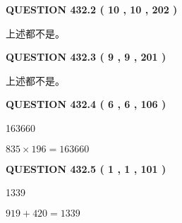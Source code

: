 \documentclass{ctexart}
\begin{document}
 
  
\vspace{0.2in}
  
{\textbf{\Large{QUESTION
432.2 
 ( 10 , 10 , 202 )
}}}
  
  
 
 
\noindent{}
 
 
 上述都不是。
 
 
 
 
  
\vspace{0.2in}
  
{\textbf{\Large{QUESTION
432.3 
 ( 9 , 9 , 201 )
}}}
  
  
 
 
\noindent{}
 
 
 上述都不是。
 
 
 
 
  
\vspace{0.2in}
  
{\textbf{\Large{QUESTION
432.4 
 ( 6 , 6 , 106 )
}}}
  
  
 
 
\noindent{}

163660
 
 
 
 
\noindent{}

$ %
835 \times  %
196=   %
163660$
 
 
  
\vspace{0.2in}
  
{\textbf{\Large{QUESTION
432.5 
 ( 1 , 1 , 101 )
}}}
  
  
 
 
\noindent{}

1339
 
 
 
 
\noindent{}

$ %
919 +  %
420=   %
1339$
 
 
  
\end{document}
